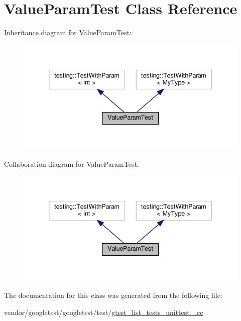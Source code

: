 \hypertarget{classValueParamTest}{}\section{Value\+Param\+Test Class Reference}
\label{classValueParamTest}


Inheritance diagram for Value\+Param\+Test\+:\nopagebreak
\begin{figure}[H]
\begin{center}
\leavevmode
\includegraphics[width=338pt]{classValueParamTest__inherit__graph}
\end{center}
\end{figure}


Collaboration diagram for Value\+Param\+Test\+:\nopagebreak
\begin{figure}[H]
\begin{center}
\leavevmode
\includegraphics[width=338pt]{classValueParamTest__coll__graph}
\end{center}
\end{figure}


The documentation for this class was generated from the following file\+:\begin{DoxyCompactItemize}
\item 
vendor/googletest/googletest/test/\hyperlink{gtest__list__tests__unittest___8cc}{gtest\+\_\+list\+\_\+tests\+\_\+unittest\+\_\+.\+cc}\end{DoxyCompactItemize}
